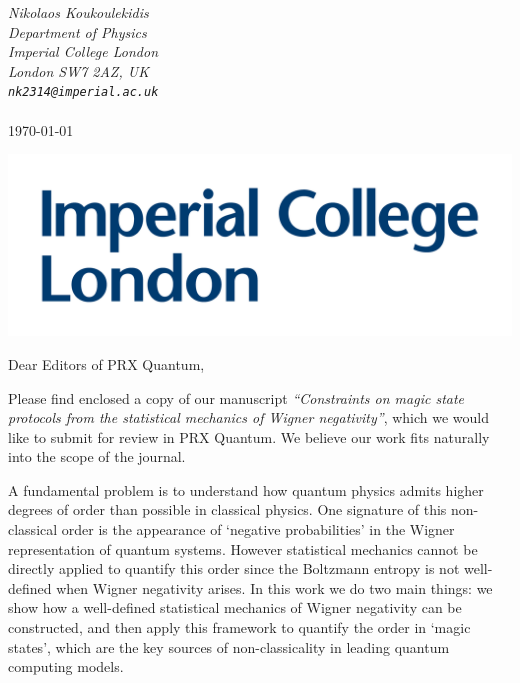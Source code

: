 \documentclass[11pt]{letter}
\begin{document}
\hfill\begin{minipage}{6cm}
	\raggedright
	\vspace{-2.5cm}
	{\footnotesize\itshape Nikolaos Koukoulekidis}\\
	{\footnotesize\itshape Department of Physics}\\
	{\footnotesize\itshape Imperial College London}\\
	{\footnotesize\itshape London SW7 2AZ, UK}\\
	{\footnotesize\itshape %
		\verb|nk2314@imperial.ac.uk|}\\
	~\\
		\footnotesize\today
\end{minipage}

\vspace{-3.5cm}
\includegraphics[scale=.1]{icllogo.png}
\vspace{3.5cm}

\vspace{-1.5cm}
Dear Editors of PRX Quantum,

\vspace{.3cm}
	
Please find enclosed a copy of our manuscript \emph{``Constraints on magic state protocols from the statistical mechanics of Wigner negativity''}, which we would like to submit for review in PRX Quantum. 
We believe our work fits naturally into the scope of the journal. 

A fundamental problem is to understand how quantum physics admits higher degrees of order than possible in classical physics. One signature of this non-classical order is the appearance of `negative probabilities' in the Wigner representation of quantum systems. However statistical mechanics cannot be directly applied to quantify this order since the Boltzmann entropy is not well-defined when Wigner negativity arises. In this work we do two main things: we show how a well-defined statistical mechanics of Wigner negativity can be constructed, and then apply this framework to quantify the order in `magic states', which are the key sources of non-classicality in leading quantum computing models. 
\end{document}
